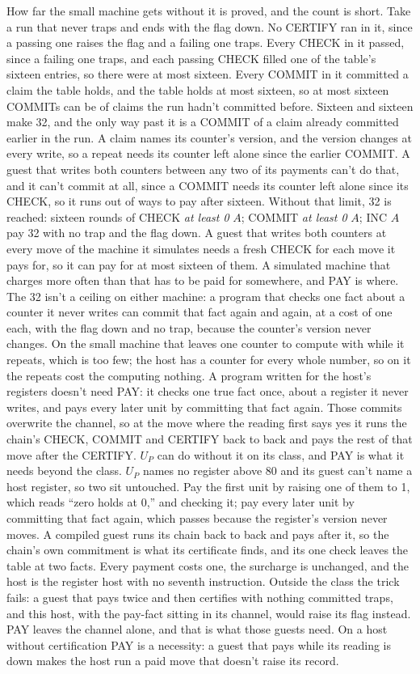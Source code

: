 \documentclass[11pt,twoside]{article}
\theoremstyle{thielethm}
\theoremstyle{thieledef}
\theoremstyle{thieledef}
\theoremstyle{thieledef}
\theoremstyle{thielethm}
\theoremstyle{thieleobs}
\theoremstyle{thielethm}
\begin{document}
How far the small machine gets without it is proved, and the count is short. Take a run that
never traps and ends with the flag down. No CERTIFY ran in it, since a passing one raises the
flag and a failing one traps. Every CHECK in it passed, since a failing one traps, and each
passing CHECK filled one of the table's sixteen entries, so there were at most sixteen. Every
COMMIT in it committed a claim the table holds, and the table holds at most sixteen, so at most
sixteen COMMITs can be of claims the run hadn't committed before. Sixteen and sixteen make 32, and the only way
past it is a COMMIT of a claim already committed earlier in the run. A claim names its counter's version, and the version changes at every write, so a
repeat needs its counter left alone since the earlier COMMIT. A guest that writes both counters between any two of its payments can't do that, and it can't commit at all, since a COMMIT needs its counter left alone since its CHECK, so it runs out of ways to pay after sixteen. Without that limit, 32 is reached: sixteen rounds of CHECK \emph{at least 0} $A$; COMMIT \emph{at least 0} $A$; INC $A$
pay 32 with no trap and the flag down. A guest that writes both counters at every move of the
machine it simulates needs a fresh CHECK for each move it pays for, so it can pay for at most
sixteen of them. A simulated machine that charges more often than that has to be paid for
somewhere, and PAY is where. The 32 isn't a ceiling on either machine: a program that checks one fact about a counter it never writes can commit that fact again and again, at a cost of one each, with the flag down and no trap, because the counter's version never changes. On the small machine that leaves one counter to compute with while it repeats, which is too few; the host has a counter for every whole number, so on it the repeats cost the computing nothing. A program written for the host's registers doesn't need PAY: it checks one true fact once, about a register it never writes, and pays every later unit by committing that fact again. Those commits overwrite the channel, so at the move where the reading first says yes it runs the chain's CHECK, COMMIT and CERTIFY back to back and pays the rest of that move after the CERTIFY. $U_P$ can do without it on its class, and PAY is what it needs beyond the class. $U_P$ names no register above 80 and its guest can't name a host register, so two sit untouched. Pay the first unit by raising one of them to 1, which reads ``zero holds at 0,'' and checking it; pay every later unit by committing that fact again, which passes because the register's version never moves. A compiled guest runs its chain back to back and pays after it, so the chain's own commitment is what its certificate finds, and its one check leaves the table at two facts. Every payment costs one, the surcharge is unchanged, and the host is the register host with no seventh instruction. Outside the class the trick fails: a guest that pays twice and then certifies with nothing committed traps, and this host, with the pay-fact sitting in its channel, would raise its flag instead. PAY leaves the channel alone, and that is what those guests need. On a host without
certification PAY is a necessity: a guest that pays while its reading
is down makes the host run a paid move that doesn't raise its record.
\end{document}
